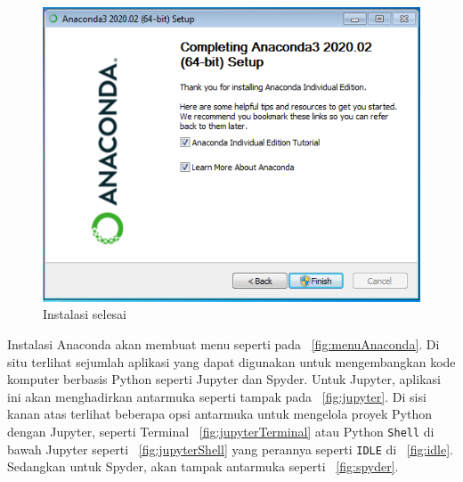 \begin{figure}[h!]
  \begin{center}
    \includegraphics[scale=.5]{pics/anacondaInstall9.png}
    \caption{Instalasi selesai}
    \label{fig:instalasiEnd}
  \end{center}
\end{figure}

Instalasi Anaconda akan membuat menu seperti pada \figurename~\ref{fig:menuAnaconda}. Di situ terlihat sejumlah aplikasi yang dapat digunakan untuk mengembangkan kode komputer berbasis Python seperti Jupyter dan Spyder. Untuk Jupyter, aplikasi ini akan menghadirkan antarmuka seperti tampak pada \figurename~\ref{fig:jupyter}. Di sisi kanan atas terlihat beberapa opsi antarmuka untuk mengelola proyek Python dengan Jupyter, seperti Terminal \figurename~\ref{fig:jupyterTerminal} atau Python \texttt{Shell} di bawah Jupyter seperti \figurename~\ref{fig:jupyterShell} yang perannya seperti \texttt{IDLE} di \figurename~\ref{fig:idle}. Sedangkan untuk Spyder, akan tampak antarmuka seperti \figurename~\ref{fig:spyder}.

